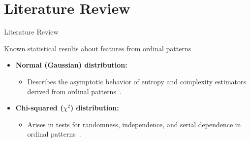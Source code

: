 \documentclass{beamer}
\begin{document}
\section{Literature Review}
\begin{frame}
	\begin{center}
		\alert{Literature Review}
	\end{center}
\end{frame}


\begin{frame}{Known statistical results about features from ordinal patterns}
	\begin{itemize}
		\item \textbf{Normal (Gaussian) distribution:}
		\begin{itemize}
			\item Describes the asymptotic behavior of entropy and complexity estimators derived from ordinal patterns~\cite{Davalos2019a, Rey2023a, Rey2025}.
		\end{itemize}
		\item \textbf{Chi-squared ($\chi^2$) distribution:}
		\begin{itemize}
			\item Arises in tests for randomness, independence, and serial dependence in ordinal patterns~\cite{Chagas2022, YamashitaRiosDeSousa2022, Rey2023, Rey2024, Shternshis2024, Shternshis2025}.
		\end{itemize}
	\end{itemize}
\end{frame}
\end{document}

